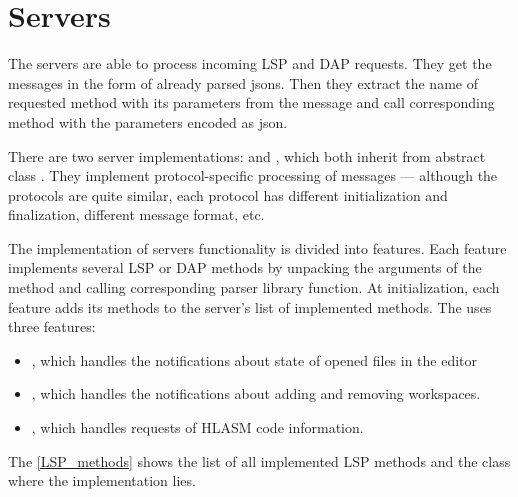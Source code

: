 \section{Servers}
The servers are able to process incoming LSP and DAP requests. They get the messages in the form of already parsed jsons. Then they extract the name of requested method with its parameters from the message and call corresponding method with the parameters encoded as json.

There are two server implementations:  and , which both inherit from abstract class . They implement protocol-specific processing of messages --- although the protocols are quite similar, each protocol has different initialization and finalization, different message format, etc.

The implementation of servers functionality is divided into features. Each feature implements several LSP or DAP methods by unpacking the arguments of the method and calling corresponding parser library function. At initialization, each feature adds its methods to the server's list of implemented methods. The  uses three features:
\begin{itemize}
	\item {}, which handles the notifications about state of opened files in the editor
	\item {}, which handles the notifications about adding and removing workspaces.
	\item {}, which handles requests of HLASM code information.
\end{itemize}
The \cref{LSP_methods} shows the list of all implemented LSP methods and the class where the implementation lies.

